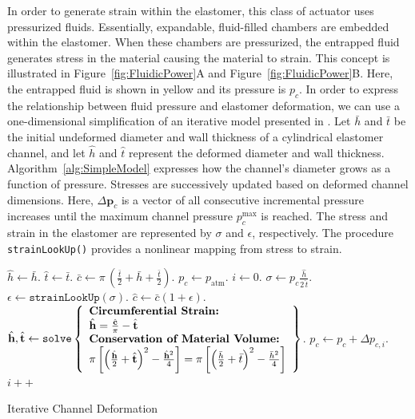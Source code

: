 In order to generate strain within the elastomer, this class of actuator uses pressurized fluids.
Essentially, expandable, fluid-filled chambers are embedded within the elastomer.
When these chambers are pressurized, the entrapped fluid generates stress in the material causing the material to strain.
This concept is illustrated in Figure~\ref{fig:FluidicPower}A and Figure~\ref{fig:FluidicPower}B.
Here, the entrapped fluid is shown in yellow and its pressure is $p_c$.
In order to express the relationship between fluid pressure and elastomer deformation, we can use a one-dimensional simplification of an iterative model presented in \citet{marchese2015design}.
Let $\bar{h}$ and $\bar{t}$ be the initial undeformed diameter and wall thickness of a cylindrical elastomer channel, and let $\hat{h}$ and $\hat{t}$ represent the deformed diameter and wall thickness.
Algorithm~\ref{alg:SimpleModel} expresses how the channel's diameter grows as a function of pressure.
Stresses are successively updated based on deformed channel dimensions.
Here, $\Delta \mathbf{p}_{c}$ is a vector of all consecutive incremental pressure increases until the maximum channel pressure $p_c^{\text{max}}$ is reached.
The stress and strain in the elastomer are represented by $\sigma$ and $\epsilon$, respectively.
The procedure \texttt{strainLookUp()} provides a nonlinear mapping from stress to strain.
\begin{algorithm}[htb]
\footnotesize
  \DontPrintSemicolon
  \SetAlgoLined
  $\hat{h} \gets \bar{h}$. \;
  $\hat{t} \gets \bar{t}$. \;
  $\bar{c} \gets \pi \, \left(\frac{\bar{t}}{2} + \bar{h} + \frac{\bar{t}}{2}\right)$. \;
  $p_c \gets p_{\text{atm}}$. \;
  $i \gets 0$. \;
  {
     $\sigma \gets p_c \frac{\hat{h}}{2 \,\hat{t}}$. \;
     $\epsilon \gets \texttt{strainLookUp}(\sigma)$. \;
     $\hat{c} \gets \bar{c}\left( 1 + \epsilon \right)$. \;
     $\hat{h}, \hat{t} \gets \texttt{solve}\left\{
	\begin{array}{l}
       \text{\textbf{Circumferential Strain:}} \\
       \hat{h} = \frac{\hat{c}}{\pi} - \hat{t} \\
       \text{\textbf{Conservation of Material Volume:}} \\
       \pi \left[ \left( \frac{\hat{h}}{2} + \hat{t}\right)^2 - \frac{\hat{h}^2}{4} \right]= \pi \left[\left( \frac{\bar{h}}{2} + \bar{t}\right)^2 - \frac{\bar{h}^2}{4}\right]
     \end{array}
     \right\} $. \;
     $p_c \gets p_c + \Delta p_{c,i}$. \;
     $i++$
   }
\normalsize
 \caption{Iterative Channel Deformation}
  \label{alg:SimpleModel}
\end{algorithm}

